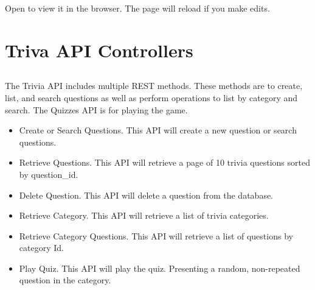 \documentclass[letterpaper,10pt,english]{sphinxmanual}
\begin{document}
Open  to view it in the browser. The page will reload if you make edits.


\chapter{Triva API Controllers}
\label{\detokenize{index:module-controller}}\label{\detokenize{index:triva-api-controllers}}

\section{}
\label{\detokenize{index:introduction}}
The Trivia API includes multiple REST methods. 
These methods are to create, list, and search questions as well as perform operations
to list by category and search. The Quizzes API is for playing the game.
\begin{itemize}
\item {} 
Create or Search Questions. This API will create a new question or search questions.

\item {} 
Retrieve Questions. This API will retrieve a page of 10 trivia questions sorted by question\_id.

\item {} 
Delete Question. This API will delete a question from the database.

\item {} 
Retrieve Category. This API will retrieve a list of trivia categories.

\item {} 
Retrieve Category Questions. This API will retrieve a list of questions by category Id.

\item {} 
Play Quiz. This API will play the quiz. Presenting a random, non-repeated question in the category.

\end{itemize}
\end{document}

